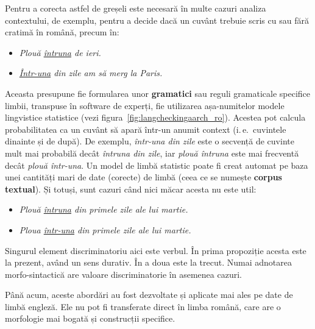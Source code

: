 \begin{multicols}{2}
Pentru a corecta astfel de greșeli este necesară în multe cazuri analiza contextului, de exemplu, pentru a decide dacă un cuvânt trebuie scris cu sau fără cratimă în română, precum în:

\begin{itemize}
\item \textit{Plouă \underline{întruna} de ieri.}
\item \textit{\underline{Într-una} din zile am să merg la Paris.}
\end{itemize}

Aceasta presupune fie formularea unor \textbf{gramatici} sau reguli gramaticale specifice limbii, transpuse în software de experți, fie utilizarea așa-numitelor modele lingvistice statistice (vezi figura~\ref{fig:langcheckingaarch_ro}). Acestea pot calcula probabilitatea ca un cuvânt să apară într-un anumit context (i.\,e.~cuvintele dinainte și de după). De exemplu, \textit{într-una din zile} este o secvență de cuvinte mult mai probabilă decât \textit{întruna din zile}, iar \textit{plouă întruna} este mai frecventă decât \textit{plouă într-una}. Un model de limbă statistic poate fi creat automat pe baza unei cantități mari de date (corecte) de limbă (ceea ce se numește \textbf{corpus textual}). Și totuși, sunt cazuri când nici măcar acesta nu este util:

\begin{itemize}
\item \textit{Plouă \underline{întruna} din primele zile ale lui martie.}
\item \textit{Ploua \underline{într-una} din primele zile ale lui martie.}
\end{itemize}

Singurul element discriminatoriu aici este verbul. În prima propoziție acesta este la prezent, având un sens durativ. În a doua este la trecut. Numai adnotarea morfo-sintactică are valoare discriminatorie în asemenea cazuri.

Până acum, aceste abordări au fost dezvoltate și aplicate mai ales pe date de limbă engleză. Ele nu pot fi transferate direct în limba română, care are o morfologie mai bogată și construcții specifice.



\end{multicols}
